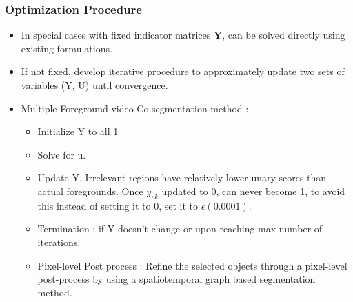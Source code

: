 \documentclass{article}
\begin{document}
\subsubsection{Optimization Procedure}
\begin{itemize}
\item In special cases with fixed indicator matrices $\textbf{Y}$, can be solved directly using existing formulations.
\item If not fixed, develop iterative procedure to approximately update two sets of variables (Y, U) until convergence.
\item Multiple Foreground video Co-segmentation method :
  \begin{itemize}
  \item Initialize Y to all 1
  \item Solve for u.
  \item Update Y. Irrelevant regions have relatively lower unary scores than actual foregrounds. Once $y_{vk}$ updated to 0, can never become 1, to avoid this instead of setting it to 0, set it to $\epsilon (0.0001)$.
  \item Termination : if Y doesn't change or upon reaching max number of iterations.
  \item Pixel-level Post process : Refine the selected objects through a pixel-level post-process by using a spatiotemporal graph based segmentation method.
  \end{itemize}
\end{itemize}





\end{document}
